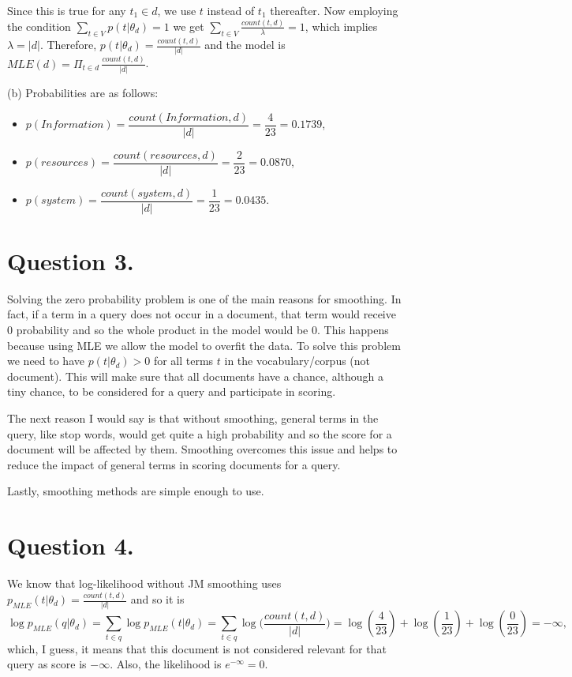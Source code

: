 \documentclass[11pt]{article}
\begin{document}
Since this is true for any $t_1 \in d$, we use $t$ instead of $t_1$ thereafter. Now employing the condition $\sum_{t \in V} p(t| \theta_d) =1$ we get $\sum_{t \in V} \frac{count(t, d)}{\lambda} = 1$, which implies $\lambda = |d|$. Therefore, $p(t| \theta_d) = \frac{count(t, d)}{|d|}$ and the model is $MLE(d) =  \Pi_{t \in d} \, \frac{count(t, d)}{|d|}$.


(b) Probabilities are as follows:
\begin{itemize}
\item $p(Information) = \dfrac{count(Information, d)}{|d|} = \dfrac{4}{23} = 0.1739$,
\item $p(resources) = \dfrac{count(resources, d)}{|d|} = \dfrac{2}{23} = 0.0870$,
\item $p(system) = \dfrac{count(system, d)}{|d|} = \dfrac{1}{23} = 0.0435$.
\end{itemize}


\section*{Question 3.}%
Solving the zero probability problem is one of the main reasons for smoothing. In fact, if a term in a query does not occur in a document, that term would receive 0 probability and so the whole product in the model would be 0. This happens because using MLE we allow the model to overfit the data. To solve this problem we need to have $p(t| \theta_d) > 0$ for all terms $t$ in the vocabulary/corpus (not document). This will make sure that all documents have a chance, although a tiny chance, to be considered for a query and participate in scoring. 

The next reason I would say is that without smoothing, general terms in the query, like stop words, would get quite a high probability and so the score for a document will be affected by them. Smoothing overcomes this issue and helps to reduce the impact of general terms in scoring documents for a query. 

Lastly, smoothing methods are simple enough to use. 


\section*{Question 4.}%
We know that log-likelihood without JM smoothing uses $p_{MLE}(t| \theta_d) = \frac{count(t,d)}{|d|}$ and so it is 
$$\log p_{MLE}(q| \theta_d) = \sum_{t \in q} \log p_{MLE}(t| \theta_d) = \sum_{t \in q} \log \Big(\frac{count(t,d)}{|d|} \Big) = \log(\frac{4}{23}) + \log(\frac{1}{23}) + \log(\frac{0}{23}) = - \infty,$$
which, I guess, it means that this document is not considered relevant for that query as score is $-\infty$. Also, the likelihood is $e^{- \infty}= 0$.
\end{document}

